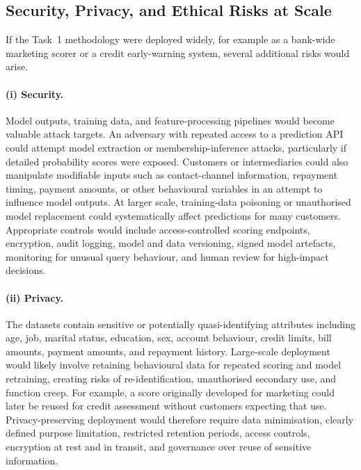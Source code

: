 \subsection{Security, Privacy, and Ethical Risks at Scale}
\label{sec:part2-risks}

If the Task~1 methodology were deployed widely, for example as a bank-wide marketing
scorer or a credit early-warning system, several additional risks would arise.

\paragraph{(i) Security.}
Model outputs, training data, and feature-processing pipelines would become valuable
attack targets. An adversary with repeated access to a prediction API could attempt
model extraction or membership-inference attacks, particularly if detailed probability
scores were exposed. Customers or intermediaries could also manipulate modifiable
inputs such as contact-channel information, repayment timing, payment amounts, or
other behavioural variables in an attempt to influence model outputs. At larger scale,
training-data poisoning or unauthorised model replacement could systematically affect
predictions for many customers. Appropriate controls would include access-controlled
scoring endpoints, encryption, audit logging, model and data versioning, signed model
artefacts, monitoring for unusual query behaviour, and human review for high-impact
decisions.

\paragraph{(ii) Privacy.}
The datasets contain sensitive or potentially quasi-identifying attributes including
age, job, marital status, education, sex, account behaviour, credit limits, bill
amounts, payment amounts, and repayment history. Large-scale deployment would likely
involve retaining behavioural data for repeated scoring and model retraining, creating
risks of re-identification, unauthorised secondary use, and function creep. For
example, a score originally developed for marketing could later be reused for credit
assessment without customers expecting that use. Privacy-preserving deployment would
therefore require data minimisation, clearly defined purpose limitation, restricted
retention periods, access controls, encryption at rest and in transit, and governance
over reuse of sensitive information.

